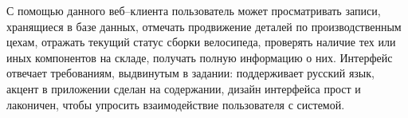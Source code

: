 С помощью данного веб--клиента пользователь может просматривать записи, хранящиеся в базе данных, отмечать продвижение деталей по производственным цехам, отражать текущий статус сборки велосипеда, проверять наличие тех или иных компонентов на складе, получать полную информацию о них. Интерфейс отвечает требованиям, выдвинутым в задании: поддерживает русский язык, акцент в приложении сделан на содержании, дизайн интерфейса прост и лаконичен, чтобы упросить взаимодействие пользователя с системой.









